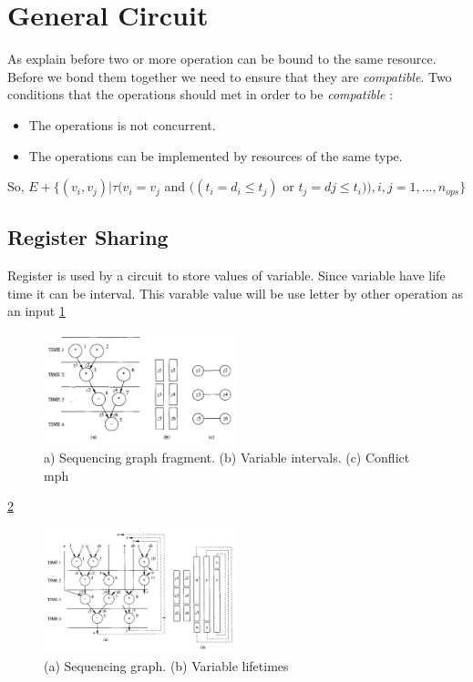 \section{General Circuit}


As explain before two or more operation can be bound to the same resource. Before we bond them together we need to ensure that they are \textit{compatible}. Two conditions that the operations should met in order to be \textit{compatible} :

\begin{itemize}
\item The operations is not concurrent.
\item The operations can be implemented by resources of the same type.
\end{itemize}

So, $ E+\{(v_{i},v_{j})|\tau(v_{i}=v_{j} $ and $ ((t_{i}=d_{i} \leq t_{j}) $ or $ t_{j}=d{j} \leq t_{i})),i,j=1,...,n_{ops}\}$ %


\subsection{Register Sharing}

Register is used by a circuit to store values of variable. Since variable have life time it can be interval. This varable value will be use letter by other operation as an input
\ref{fig:Sequencing_graph_fragment}
\begin{figure}[h]
    \centering
    \includegraphics[width=0.5\textwidth]{Sequencing_graph_fragment}
    \caption{ a) Sequencing graph fragment. (b) Variable intervals. (c) Conflict mph \cite{b1}}
    \label{fig:Sequencing_graph_fragment}
\end{figure}

\ref{fig:Sequencing_graph}
\begin{figure}[h]
    \centering
    \includegraphics[width=0.5\textwidth]{Sequencing_graph}
    \caption{ (a) Sequencing graph. (b) Variable lifetimes \cite{b1}}
    \label{fig:Sequencing_graph}
\end{figure}

